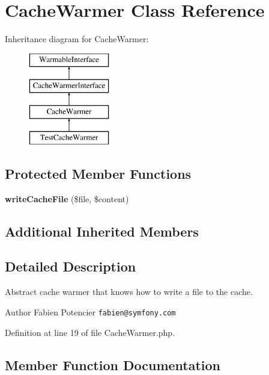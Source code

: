 \section{Cache\+Warmer Class Reference}
\label{class_symfony_1_1_component_1_1_http_kernel_1_1_cache_warmer_1_1_cache_warmer}
Inheritance diagram for Cache\+Warmer\+:\begin{figure}[H]
\begin{center}
\leavevmode
\includegraphics[height=4.000000cm]{class_symfony_1_1_component_1_1_http_kernel_1_1_cache_warmer_1_1_cache_warmer}
\end{center}
\end{figure}
\subsection*{Protected Member Functions}
\begin{DoxyCompactItemize}
\item 
{\bf write\+Cache\+File} (\$file, \$content)
\end{DoxyCompactItemize}
\subsection*{Additional Inherited Members}


\subsection{Detailed Description}
Abstract cache warmer that knows how to write a file to the cache.

\begin{DoxyAuthor}{Author}
Fabien Potencier {\tt fabien@symfony.\+com} 
\end{DoxyAuthor}


Definition at line 19 of file Cache\+Warmer.\+php.



\subsection{Member Function Documentation}
